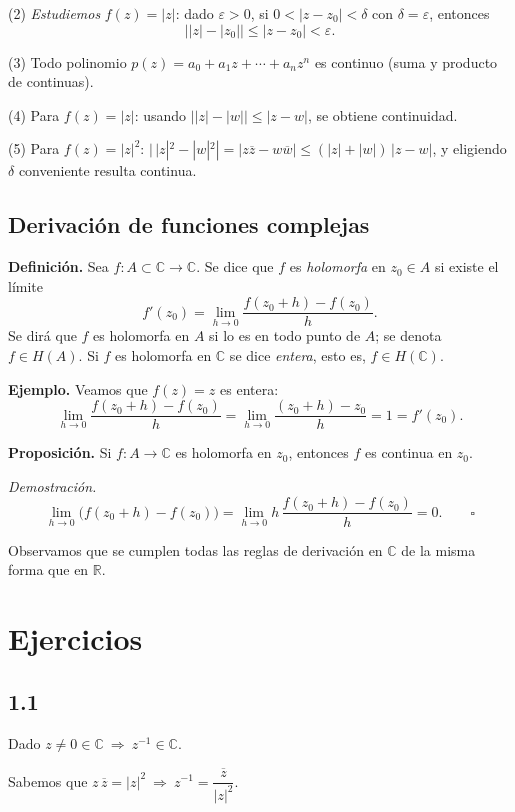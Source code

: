 \documentclass[a4paper,12pt]{article}
\begin{document}
(2) \textit{Estudiemos} \(f(z)=|z|\):
dado \(\varepsilon>0\), si \(0<|z-z_0|<\delta\) con \(\delta=\varepsilon\), entonces
\[
\big||z|-|z_0|\big|\le |z-z_0|<\varepsilon.
\]

(3) Todo polinomio \(p(z)=a_0+a_1z+\cdots+a_nz^n\) es continuo (suma y
producto de continuas).

(4) Para \(f(z)=|z|\): usando \(\big||z|-|w|\big|\le |z-w|\), se obtiene continuidad.

(5) Para \(f(z)=|z|^2\): \(|\,|z|^2-|w|^2|=|z\overline{z}-w\overline{w}|
\le (|z|+|w|)\,|z-w|\), y eligiendo \(\delta\) conveniente resulta continua.

\subsection{Derivación de funciones complejas}

\textbf{Definición.}
Sea \(f:A\subset\mathbb{C}\to\mathbb{C}\). Se dice que \(f\) es
\emph{holomorfa} en \(z_0\in A\) si existe el límite
\[
f'(z_0)=\lim_{h\to 0}\frac{f(z_0+h)-f(z_0)}{h}.
\]
Se dirá que \(f\) es holomorfa en \(A\) si lo es en todo punto de \(A\); se
denota \(f\in H(A)\).
Si \(f\) es holomorfa en \(\mathbb{C}\) se dice \emph{entera}, esto es,
\(f\in H(\mathbb{C})\).

\textbf{Ejemplo.}
Veamos que \(f(z)=z\) es entera:
\[
\lim_{h\to 0}\frac{f(z_0+h)-f(z_0)}{h}
=\lim_{h\to 0}\frac{(z_0+h)-z_0}{h}=1=f'(z_0).
\]

\textbf{Proposición.}
Si \(f:A\to\mathbb{C}\) es holomorfa en \(z_0\), entonces \(f\) es continua en \(z_0\).

\textit{Demostración.}
\[
\lim_{h\to 0}\bigl(f(z_0+h)-f(z_0)\bigr)
=\lim_{h\to 0}h\,\frac{f(z_0+h)-f(z_0)}{h}=0.
\qquad\square
\]

Observamos que se cumplen todas las reglas de derivación en \(\mathbb{C}\)
de la misma forma que en \(\mathbb{R}\).
\section*{Ejercicios}

\subsection*{1.1} Dado \(z\neq 0\in\mathbb{C}\ \Rightarrow\ z^{-1}\in\mathbb{C}\).

Sabemos que \(z\,\overline z=|z|^{2}\ \Rightarrow\ z^{-1}=\dfrac{\overline z}{|z|^{2}}\).
\end{document}
